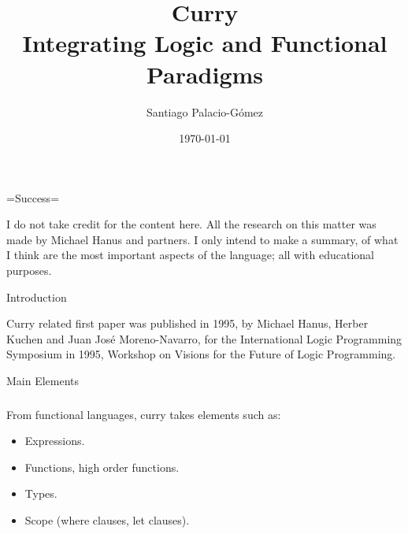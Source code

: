 \documentclass{beamer}
\title{Curry\\ Integrating Logic and Functional Paradigms}
\author{Santiago Palacio-Gómez}
\institute{Universidad EAFIT\\Seminario de L\'ogica y Computaci\'on}
\date{\today}
\begin{document}
=Success=
\begin{frame}
  \titlepage
\end{frame}



\begin{frame}
  I do not take credit for the content here. All the research on this matter was made by Michael Hanus and partners. I only intend to make a summary, of what I think are the most important aspects of the language; all with educational purposes.
\end{frame}
\begin{frame}[allowframebreaks]
  \tableofcontents
\end{frame}


\begin{section}{Introduction}
  
  \begin{frame}
    Curry related first paper was published in 1995, by Michael Hanus, Herber Kuchen and Juan Jos\'e Moreno-Navarro, for the International Logic Programming Symposium in 1995, Workshop on Visions for the Future of Logic Programming.
  \end{frame}
\end{section}



\begin{section}{Main Elements}
\begin{frame}
\frametitle{\secname}
  From functional languages, curry takes elements such as:
\begin{itemize}
  \item Expressions.
  \item Functions, high order functions.
  \item Types.
  \item Scope (where clauses, let clauses).
\end{itemize}
\end{frame}
\end{section}
\end{document}
